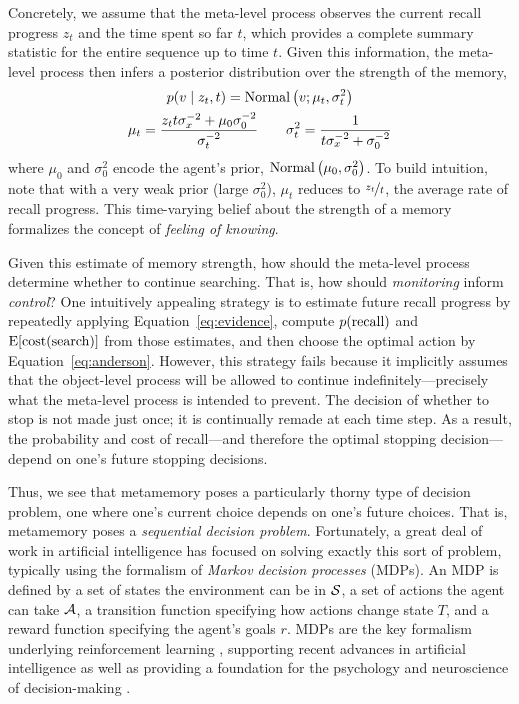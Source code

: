Concretely, we assume that the meta-level process observes the current recall progress $z_t$ and the time spent so far $t$, which provides a complete summary statistic for the entire sequence up to time $t$. Given this information, the meta-level process then infers a posterior distribution over the strength of the memory,
%
\begin{equation}\label{eq:belief}
\begin{gathered}
  p(v \mid z_t, t) = \mNormal{v; \mu_t, \sigma_t^2} \\
  \mu_t = \frac{z_t t \sigma_x^{-2} + \mu_0 \sigma_0^{-2}}{\sigma_t^{-2}} 
  \quad\quad
  \sigma_t^2 = \frac{1}{t \sigma_x^{-2} + \sigma_0^{-2}}
\end{gathered}
\end{equation}
%
where $\mu_0$ and $\sigma_0^2$ encode the agent's prior, $\mNormal{\mu_0, \sigma_0^2}$. To build intuition, note that with a very weak prior (large $\sigma_0^2$), $\mu_t$ reduces to $\nicefrac{z_t}{t}$, the average rate of recall progress. This time-varying belief about the strength of a memory formalizes the concept of \emph{feeling of knowing}.

Given this estimate of memory strength, how should the meta-level process determine whether to continue searching. That is, how should \emph{monitoring} inform \emph{control}? One intuitively appealing strategy is to estimate future recall progress by repeatedly applying Equation~\ref{eq:evidence}, compute $p\recall$ and $\E[\text{cost}(\text{search})]$ from those estimates, and then choose the optimal action by Equation~\ref{eq:anderson}. However, this strategy fails because it implicitly assumes that the object-level process will be allowed to continue indefinitely---precisely what the meta-level process is intended to prevent. The decision of whether to stop is not made just once; it is continually remade at each time step. As a result, the probability and cost of recall---and therefore the optimal stopping decision---depend on one's future stopping decisions.

Thus, we see that metamemory poses a particularly thorny type of decision problem, one where one's current choice depends on one's future choices. That is, metamemory poses a \emph{sequential decision problem}. Fortunately, a great deal of work in artificial intelligence has focused on solving exactly this sort of problem, typically using the formalism of \emph{Markov decision processes} (MDPs). An MDP is defined by a set of states the environment can be in $\S$, a set of actions the agent can take $\A$, a transition function specifying how actions change state $T$, and a reward function specifying the agent's goals $r$. MDPs are the key formalism underlying reinforcement learning \citep{sutton2018reinforcement}, supporting recent advances in artificial intelligence \citep{mnih2015human,silver2017mastering} as well as providing a foundation for the psychology and neuroscience of decision-making \citep{niv2009reinforcement,dayan2008decision,glimcher2011understanding}.

